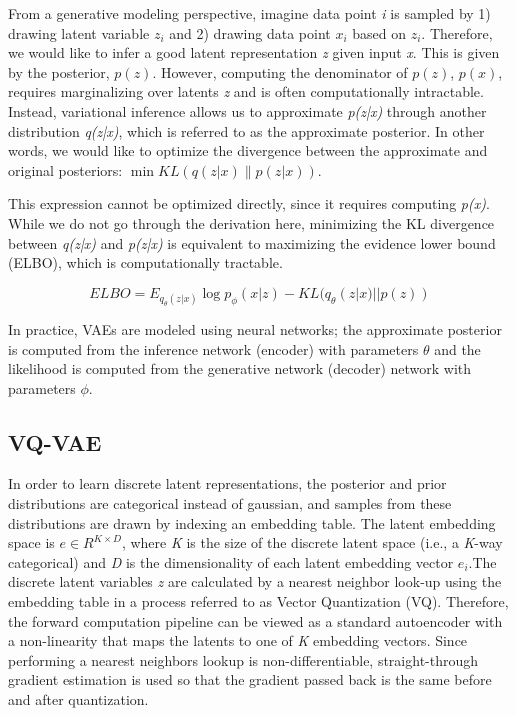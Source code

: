 \documentclass{article}
\begin{document}
From a generative modeling perspective, imagine data point \textit{i} is sampled by 1) drawing latent variable \(z_{i}\) and 2) drawing data point \(x_{i}\) based on \(z_{i}\). Therefore, we would like to infer a good latent representation \textit{z} given input \textit{x}. This is given by the posterior, \(p(z)\). However, computing the denominator of \(p(z)\), \(p(x)\), requires marginalizing over latents \textit{z} and is often computationally intractable. Instead, variational inference allows us to approximate \textit{p(z|x)} through another distribution \textit{q(z|x)}, which is referred to as the approximate posterior. In other words, we would like to optimize the divergence between the approximate and original posteriors: $\min{KL(q(z|x) \| p(z|x))}$. 


This expression cannot be optimized directly, since it requires computing \textit{p(x)}. While we do not go through the derivation here, minimizing the KL divergence between \textit{q(z|x)} and \textit{p(z|x)} is equivalent to maximizing the evidence lower bound (ELBO), which is computationally tractable. 

\begin{equation}
ELBO = E_{q_{\theta}(z|x)} \log{p_{\phi}(x|z)} - KL(q_{\theta}(z|x)||p(z))
\end{equation}

In practice, VAEs are modeled using neural networks; the approximate posterior is computed from the inference network (encoder) with parameters \(\theta\) and the likelihood is computed from the generative network (decoder) network with parameters \(\phi\). 
\subsection{VQ-VAE}
In order to learn discrete latent representations, the posterior and prior distributions are categorical instead of gaussian, and samples from these distributions are drawn by indexing an embedding table. The latent embedding space is \(e \in R^{K \times D}\), where \textit{K} is the size of the discrete latent space (i.e., a \textit{K}-way categorical) and \textit{D} is the dimensionality of each latent embedding vector \(e_{i}\).The discrete latent variables \textit{z} are calculated by a nearest neighbor look-up using the embedding table in a process referred to as Vector Quantization (VQ). Therefore, the forward computation pipeline can be viewed as a standard autoencoder with a non-linearity that maps the latents to one of \textit{K} embedding vectors. Since performing a nearest neighbors lookup is non-differentiable, straight-through gradient estimation is used so that the gradient passed back is the same before and after quantization. 
\end{document}
